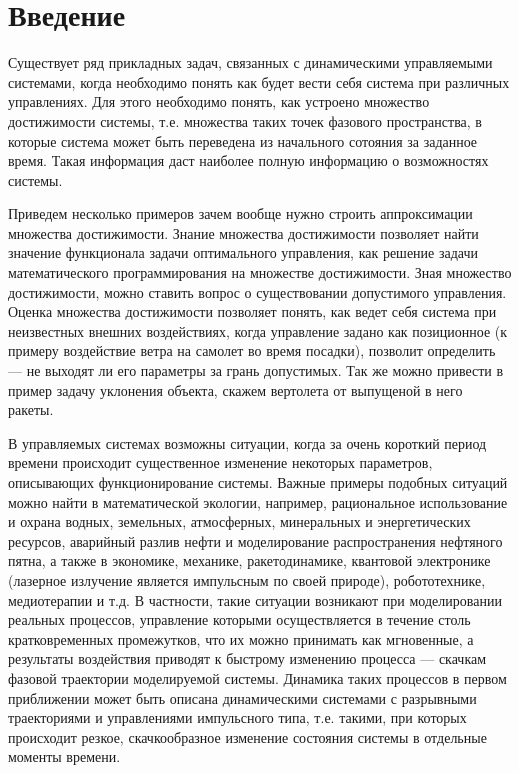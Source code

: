 \section*{Введение}
\label{intro}

Существует ряд прикладных задач, связанных с динамическими
управляемыми системами, когда необходимо понять как будет вести себя
система при различных управлениях. Для этого необходимо понять, как
устроено множество достижимости системы, т.е. множества таких точек
фазового пространства, в которые система может быть переведена из
начального сотояния за заданное время. Такая информация даст наиболее
полную информацию о возможностях системы.

Приведем несколько примеров зачем вообще нужно строить аппроксимации
множества достижимости. Знание множества достижимости позволяет найти
значение функционала задачи оптимального управления, как решение
задачи математического программирования на множестве
достижимости. Зная множество достижимости, можно ставить вопрос о
существовании допустимого управления. Оценка множества достижимости
позволяет понять, как ведет себя система при неизвестных внешних
воздействиях, когда управление задано как позиционное (к примеру
воздействие ветра на самолет во время посадки), позволит определить
--- не выходят ли его параметры за грань допустимых.  Так же можно
привести в пример задачу уклонения объекта, скажем вертолета от
выпущеной в него ракеты.

В управляемых системах возможны ситуации, когда за
очень короткий период времени происходит существенное изменение
некоторых параметров, описывающих функционирование системы.  Важные
примеры подобных ситуаций можно найти в математической экологии,
например, рациональное использование и охрана водных, земельных,
атмосферных, минеральных и энергетических ресурсов, аварийный разлив
нефти и моделирование распространения нефтяного пятна,  а также в
экономике, механике, ракетодинамике,  квантовой электронике (лазерное
излучение является импульсным по своей природе), робототехнике,
медиотерапии  и т.д. В частности, такие ситуации возникают при
моделировании реальных процессов, управление которыми осуществляется в
течение столь кратковременных промежутков, что их можно принимать как
мгновенные, а результаты воздействия приводят к быстрому изменению
процесса --- скачкам фазовой траектории моделируемой системы. Динамика
таких процессов в первом приближении может быть описана динамическими
системами  с разрывными траекториями и управлениями импульсного типа,
т.е. такими, при которых происходит резкое, скачкообразное изменение
состояния системы в отдельные моменты времени. 

